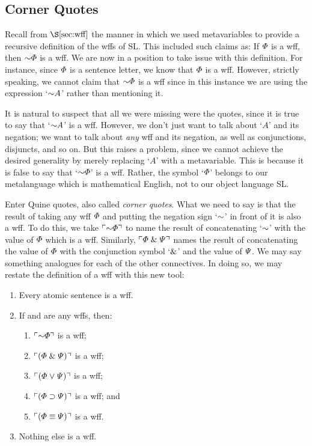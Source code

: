 \subsection{Corner Quotes}
  \label{sec:Corner Quotes}

Recall from $\S\ref{sec:wff}$ the manner in which we used metavariables to provide a recursive definition of the wffs of SL.
This included such claims as: If $\varPhi{}$ is a wff, then $\enot \metaA{}$ is a wff.
We are now in a position to take issue with this definition.
For instance, since $\varPhi$ is a sentence letter, we know that $\varPhi$ is a wff. 
However, strictly speaking, we cannot claim that $\enot \metaA$ is a wff since in this instance we are using the expression `$\enot A$' rather than mentioning it.

It is natural to suspect that all we were missing were the quotes, since it is true to say that `$\enot A$' is a wff.
However, we don't just want to talk about `$A$' and its negation; we want to talk about \textit{any} wff and its negation, as well as conjunctions, disjuncts, and so on.
But this raises a problem, since we cannot achieve the desired generality by merely replacing `$A$' with a metavariable.
This is because it is false to say that `$\enot \metaA{}$' is a wff.
Rather, the symbol `$\varPhi{}$' belongs to our metalanguage which is mathematical English, not to our object language SL.

Enter Quine quotes, also called \textit{corner quotes}.
What we need to say is that the result of taking any wff $\varPhi{}$ and putting the negation sign `$\enot$' in front of it is also a wff.
To do this, we take $\corner{\enot \metaA{}}$ to name the result of concatenating `$\enot$' with the value of $\varPhi$ which is a wff. 
Similarly, $\ulcorner\varPhi{} \mathrel\& \varPsi{}\urcorner$ names the result of concatenating the value of $\varPhi{}$ with the conjunction symbol `$\mathrel\&$' and the value of $\varPsi{}$.
We may say something analogues for each of the other connectives.
In doing so, we may restate the definition of a wff with this new tool:

\begin{enumerate}
  \item Every atomic sentence is a wff.
  \item If \metaA{} and \metaB{} are any wffs, then:
    \begin{enumerate}
      \item $\corner{\enot\metaA{}}$ is a wff;
      \item $\ulcorner(\varPhi{}\mathrel\&\varPsi{})\urcorner$ is a wff;
      \item $\ulcorner(\varPhi{}\mkern1mu\vee\mkern1mu\varPsi{})\urcorner$ is a wff;
      \item $\ulcorner(\varPhi{}\supset\varPsi{})\urcorner$ is a wff; and
      \item $\ulcorner(\varPhi{}\equiv\varPsi{})\urcorner$ is a wff.
    \end{enumerate}
  \item Nothing else is a wff.
\end{enumerate}

